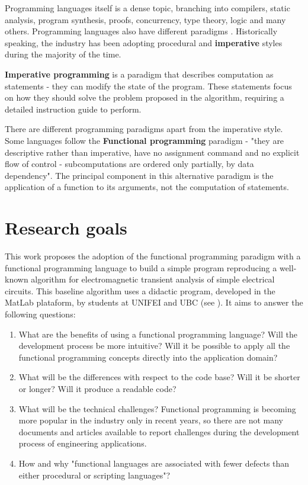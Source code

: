 Programming languages itself is a dense topic, branching into compilers, static analysis, program synthesis, proofs, concurrency, type theory, logic and many others. Programming languages also have different paradigms \cite{felleisen2018design}. Historically speaking, the industry has been adopting procedural and \textbf{imperative} styles during the majority of the time.

\textbf{Imperative programming} is a paradigm that describes computation as statements - they can modify the state of the program. These statements focus on how they should solve the problem proposed in the algorithm, requiring a detailed instruction guide to perform.

There are different programming paradigms apart from the imperative style. Some languages follow the \textbf{Functional programming} paradigm - "they are descriptive rather than imperative, have no assignment command and no explicit flow of control - subcomputations are ordered only partially, by data dependency"\cite{turner2006church}. The principal component in this alternative paradigm is the application of a function to its arguments, not the computation of statements.   


\section{Research goals}
\label{rgoals}

This work proposes the adoption of the functional programming paradigm with a functional programming language to build a simple program reproducing a well-known algorithm for electromagnetic transient analysis of simple electrical circuits. This baseline algorithm uses a didactic program, developed in the MatLab plataform, by students at UNIFEI and UBC (see \cite{thtaoctave}). It aims to answer the following questions:



\begin{enumerate}
  \item What are the benefits of using a functional programming language? Will the development process be more intuitive? Will it be possible to apply all the functional programming concepts directly into the application domain? 
  \item What will be the differences with respect to the code base? Will it be shorter or longer? Will it produce a readable code?
  \item What will be the technical challenges? Functional programming is becoming more popular in the industry only in recent years, so there are not many documents and articles available to report challenges during the development process of engineering applications.
  \item How and why "functional languages are associated with fewer defects than either procedural or scripting languages"\cite{ray2014large}?
\end{enumerate}

